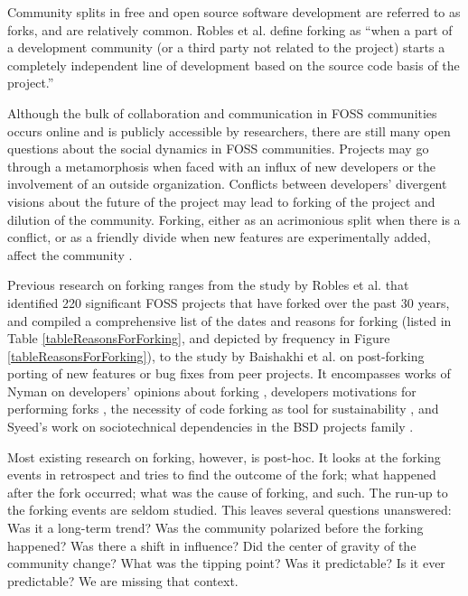 \documentclass[12pt,letterpaper]{gthesis2}  %
\begin{document}
Community splits in free and open source software development are referred to as forks, and are relatively common. Robles et al. \cite{Robles} define forking as ``when a part of a development community (or a third party not related to the project) starts a completely independent line of development based on the source code basis of the project.'' 

Although the bulk of collaboration and communication in FOSS communities occurs online and is publicly accessible by researchers, there are still many open questions about the social dynamics in FOSS communities. Projects may go through a metamorphosis when faced with an influx of new developers or the involvement of an outside organization. Conflicts between developers' divergent visions about the future of the project may lead to forking of the project and dilution of the community. Forking, either as an acrimonious split when there is a conflict, or as a friendly divide when new features are experimentally added, affect the community \cite{Bezrukova}.

Previous research on forking ranges from the study by Robles et al. \cite{Robles} that identified 220 significant FOSS projects that have forked over the past 30 years, and compiled a comprehensive list of the dates and reasons for forking (listed in Table \ref{tableReasonsForForking}, and depicted by frequency in Figure \ref{tableReasonsForForking}), to the study by Baishakhi et al. \cite{Baishakhi} on post-forking porting of new features or bug fixes from peer projects. It encompasses works of Nyman on developers' opinions about forking \cite{NymanHackersForking}, developers motivations for performing forks \cite{NymanToForkOrNotToFork}, the necessity of code forking as tool for sustainability \cite{NymanForkingSustainability}, and Syeed's work on sociotechnical dependencies in the BSD projects family \cite{Syeed}.

Most existing research on forking, however, is post-hoc. It looks at the forking events in retrospect and tries to find the outcome of the fork; what happened after the fork occurred; what was the cause of forking, and such. The run-up to the forking events are seldom studied. This leaves several questions unanswered: Was it a long-term trend? Was the community polarized before the forking happened? Was there a shift in influence? Did the center of gravity of the community change? What was the tipping point? Was it predictable? Is it ever predictable? We are missing that context. 
\end{document}
